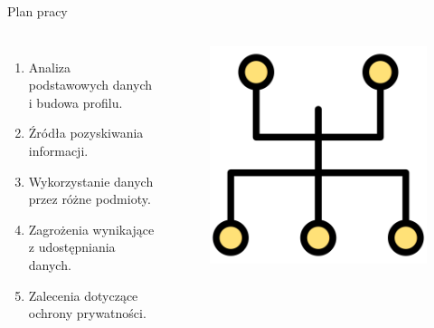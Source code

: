 \begin{frame}{Plan pracy}
  \begin{columns}[c]
    \begin{enumerate}
      \item Analiza podstawowych danych i budowa profilu.
      \item Źródła pozyskiwania informacji.
      \item Wykorzystanie danych przez różne podmioty.
      \item Zagrożenia wynikające z udostępniania danych.
      \item Zalecenia dotyczące ochrony prywatności.
    \end{enumerate}
    \begin{figure}
      \centering
      \includegraphics[height=0.45\textheight]{images/network-topology.png}
    \end{figure}
\end{columns}
\end{frame}


